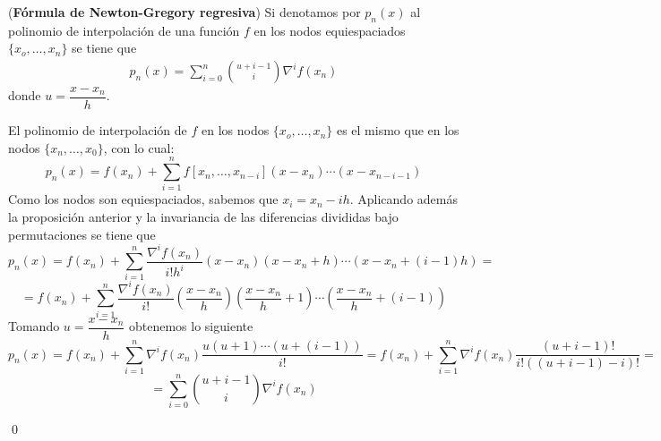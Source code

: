         \begin{teo}
        (\textbf{Fórmula de Newton-Gregory regresiva}) Si denotamos por $p_n(x)$ al polinomio de interpolación de una función $f$ en los nodos equiespaciados $\{x_o,\ldots,x_n\}$ se tiene que
        \begin{align}
        p_n(x)=\sum_{i=0}^n\binom{u+i-1}{i}\nabla^i f(x_n)
        \label{newton-gregoryreg}
        \end{align}
        donde $u=\dfrac{x-x_n}{h}$. 
        
        \end{teo}
        \begin{dem}

        El polinomio de interpolación de $f$ en los nodos $\{x_o,\ldots,x_n\}$ es el mismo que en los nodos $\{x_n,\ldots,x_0\}$, con lo cual:
        $$p_n(x)=f(x_n)+\sum_{i=1}^nf[x_n,\ldots,x_{n-i}](x-x_n)\cdots(x-x_{n-i-1})$$
        Como los nodos son equiespaciados, sabemos que $x_i=x_n-ih$. Aplicando además la proposición anterior y la invariancia de las diferencias divididas bajo permutaciones se tiene que
        $$p_n(x)=f(x_n)+\sum_{i=1}^n\frac{\nabla^i f(x_n)}{i! h^i}(x-x_n)(x-x_n+h)\cdots(x-x_n+(i-1)h)=$$
        $$=f(x_n)+\sum_{i=1}^n\frac{\nabla^i f(x_n)}{i!} \left(\frac{x-x_n}{h}\right)\left(\frac{x-x_n}{h}+1\right)\cdots\left(\frac{x-x_n}{h}+(i-1)\right)$$
        Tomando $u=\dfrac{x-x_n}{h}$ obtenemos lo siguiente
        $$p_n(x)=f(x_n)+\sum_{i=1}^n\nabla^if(x_n)\frac{u(u+1)\cdots(u+(i-1))}{i!}=f(x_n)+\sum_{i=1}^n\nabla^if(x_n)\frac{(u+i-1)!}{i!((u+i-1)-i)!}=$$
        $$=\sum_{i=0}^n\binom{u+i-1}{i}\nabla^i f(x_n)$$
                
        \qed\end{dem}
